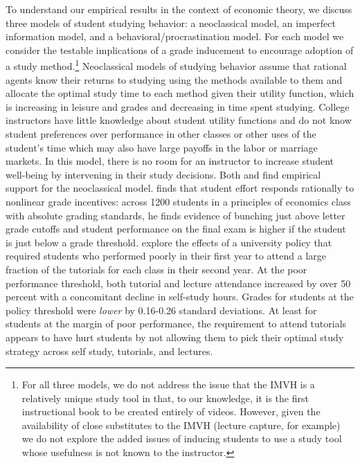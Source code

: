 \documentclass[12pt]{article}
\begin{document}
To understand our empirical results in the context of economic theory, we discuss three models of student studying behavior: a neoclassical model, an imperfect information model, and a behavioral/procrastination model.
For each model we consider the testable implications of a grade inducement to encourage adoption of a study method.\footnote{For all three models, we do not address the issue that the IMVH is a relatively unique study tool in that, to our knowledge, it is the first instructional book to be created entirely of videos. However, given the availability of close substitutes to the IMVH (lecture capture, for example) we do not explore the added issues of inducing students to use a study tool whose usefulness is not known to the instructor.} Neoclassical models of studying behavior assume that rational agents know their returns to studying using the methods available to them and allocate the optimal study time to each method given their utility function, which is increasing in leisure and grades and decreasing in time spent studying.
College instructors have little knowledge about student utility functions and do not know student preferences over performance in other classes or other uses of the student's time which may also have large payoffs in the labor or marriage markets.
In this model, there is no room for an instructor to increase student well-being by intervening in their study decisions.
Both \textcite{oettinger2002} and \textcite{kow2020} find empirical support for the neoclassical model. \textcite{oettinger2002} finds that student effort responds rationally to nonlinear grade incentives: across 1200 students in a principles of economics class with absolute grading standards, he finds evidence of bunching just above letter grade cutoffs and student performance on the final exam is higher if the student is just below a grade threshold. \textcite{kow2020} explore the effects of a university policy that required students who performed poorly in their first year to attend a large fraction of the tutorials for each class in their second year.
At the poor performance threshold, both tutorial and lecture attendance increased by over 50 percent with a concomitant decline in self-study hours.
Grades for students at the policy threshold were \textit{lower} by 0.16-0.26 standard deviations.
At least for students at the margin of poor performance, the requirement to attend tutorials appears to have hurt students by not allowing them to pick their optimal study strategy across self study, tutorials, and lectures.
\end{document}
